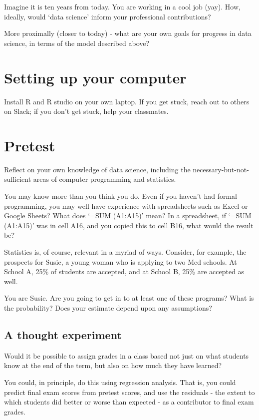 \documentclass[]{book}
\theoremstyle{definition}
\theoremstyle{definition}
\theoremstyle{definition}
\theoremstyle{remark}
\begin{document}
Imagine it is ten years from today. You are working in a cool job (yay).
How, ideally, would `data science' inform your professional
contributions?

More proximally (closer to today) - what are your own goals for progress
in data science, in terms of the model described above?

\chapter{Setting up your computer}\label{setting-up-your-computer}

Install R and R studio on your own laptop. If you get stuck, reach out
to others on Slack; if you don't get stuck, help your classmates.

\chapter{Pretest}\label{pretest}

Reflect on your own knowledge of data science, including the
necessary-but-not-sufficient areas of computer programming and
statistics.

You may know more than you think you do. Even if you haven't had formal
programming, you may well have experience with spreadsheets such as
Excel or Google Sheets? What does `=SUM (A1:A15)' mean? In a
spreadsheet, if `=SUM (A1:A15)' was in cell A16, and you copied this to
cell B16, what would the result be?

Statistics is, of course, relevant in a myriad of ways. Consider, for
example, the prospects for Susie, a young woman who is applying to two
Med schools. At School A, 25\% of students are accepted, and at School
B, 25\% are accepted as well.

You are Susie. Are you going to get in to at least one of these
programs? What is the probability? Does your estimate depend upon any
assumptions?

\section{A thought experiment}\label{a-thought-experiment}

Would it be possible to assign grades in a class based not just on what
students know at the end of the term, but also on how much they have
learned?

You could, in principle, do this using regression analysis. That is, you
could predict final exam scores from pretest scores, and use the
residuals - the extent to which students did better or worse than
expected - as a contributor to final exam grades.
\end{document}
